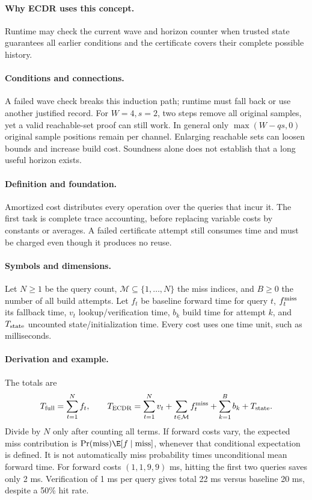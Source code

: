 \paragraph{Why ECDR uses this concept.}
Runtime may check the current wave and horizon counter when trusted state guarantees all earlier conditions and the certificate covers their complete possible history.
\paragraph{Conditions and connections.}
A failed wave check breaks this induction path; runtime must fall back or use another justified record. For $W=4,s=2$, two steps remove all original samples, yet a valid reachable-set proof can still work. In general only $\max(W-qs,0)$ original sample positions remain per channel. Enlarging reachable sets can loosen bounds and increase build cost. Soundness alone does not establish that a long useful horizon exists.

\paragraph{Definition and foundation.}
Amortized cost distributes every operation over the queries that incur it. The first task is complete trace accounting, before replacing variable costs by constants or averages. A failed certificate attempt still consumes time and must be charged even though it produces no reuse.
\paragraph{Symbols and dimensions.}
Let $N\ge1$ be the query count, $\mathcal M\subseteq\{1,\ldots,N\}$ the miss indices, and $B\ge0$ the number of all build attempts. Let $f_t$ be baseline forward time for query $t$, $f_t^{\rm miss}$ its fallback time, $v_t$ lookup/verification time, $b_k$ build time for attempt $k$, and $T_{\rm state}$ uncounted state/initialization time. Every cost uses one time unit, such as milliseconds.
\paragraph{Derivation and example.}
The totals are
\[
 T_{\rm full}=\sum_{t=1}^{N}f_t,\qquad
 T_{\rm ECDR}=\sum_{t=1}^{N}v_t+
 \sum_{t\in\mathcal M}f_t^{\rm miss}+
 \sum_{k=1}^{B}b_k+T_{\rm state}.
\]
Divide by $N$ only after counting all terms. If forward costs vary, the expected miss contribution is $\Pr(\mathrm{miss})\E[f\mid\mathrm{miss}]$, whenever that conditional expectation is defined. It is not automatically miss probability times unconditional mean forward time.
For forward costs $(1,1,9,9)$ ms, hitting the first two queries saves only 2 ms. Verification of 1 ms per query gives total 22 ms versus baseline 20 ms, despite a 50\% hit rate.
